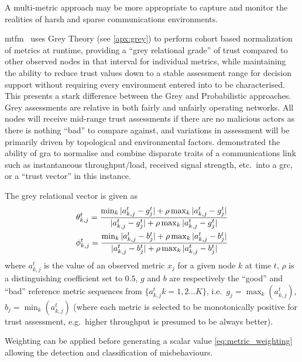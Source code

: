 A multi-metric approach may be more appropriate to capture and monitor the realities of harsh and sparse communications environments.

\gls{mtfm}~\cite{Guo11} uses Grey Theory (see \autoref{apx:grey}) to perform cohort based normalization of metrics at runtime, providing a ``grey relational grade'' of trust compared to other observed nodes in that interval for individual metrics, while maintaining the ability to reduce trust values down to a stable assessment range for decision support without requiring every environment entered into to be characterised.
This presents a stark difference between the Grey and Probabilistic approaches.
Grey assessments are relative in both fairly and unfairly operating networks.
All nodes will receive mid-range trust assessments if there are no malicious actors as there is nothing ``bad'' to compare against, and variations in assessment will be primarily driven by topological and environmental factors.
\citet{Guo11} demonstrated the ability of \gls{gra} to normalise and combine disparate traits of a communications link such as instantaneous throughput/load, received signal strength, etc.\ into a \gls{grc}, or a ``trust vector'' in this instance.

The grey relational vector is given as
%
\begin{align}
  \label{eq:grc}
  \theta_{k,j}^t = \frac{\min_k|a_{k,j}^t - g_j^t| + \rho \max_k|a_{k,j}^t-g_j^t|}{|a_{k,j}^t-g_j^t| + \rho \max_k|a_{k,j}^t-g_j^t|} \\
  \phi_{k,j}^t = \frac{\min_k|a_{k,j}^t - b_j^t| + \rho \max_k|a_{k,j}^t-b_j^t|}{|a_{k,j}^t-b_j^t| + \rho \max_k|a_{k,j}^t-b_j^t|} \notag 
\end{align}
%
where $a_{k,j}^t$ is the value of an observed metric $x_j$ for a given node $k$ at time $t$, $\rho$ is a distinguishing coefficient set to $0.5$, $g$ and $b$ are respectively the ``good'' and ``bad'' reference metric sequences from $\{a_{k,j}^t k=1,2\dots K\}$, i.e.\ $g_j=\max_k({a_{k,j}^t})$,  $b_j=\min_k({a_{k,j}^t})$ (where each metric is selected to be monotonically positive for trust assessment, e.g.\ higher throughput is presumed to be always better).

Weighting can be applied before generating a scalar value \eqref{eq:metric_weighting} allowing the detection and classification of misbehaviours.

